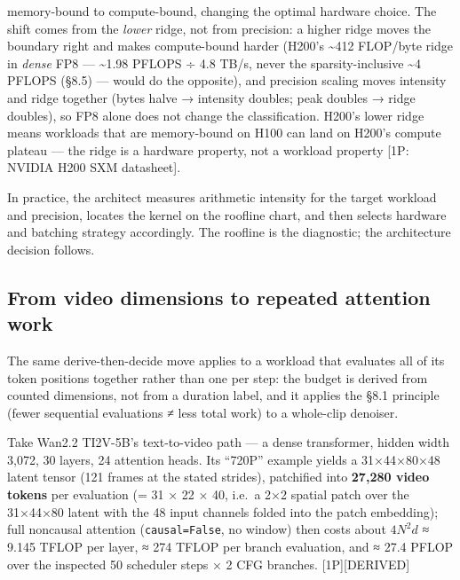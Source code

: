 \begin{itemize}
  memory-bound to compute-bound, changing the optimal hardware choice.
  The shift comes from the \emph{lower} ridge, not from precision: a
  higher ridge moves the boundary right and makes compute-bound harder
  (H200's \textasciitilde412 FLOP/byte ridge in \emph{dense} FP8 ---
  \textasciitilde1.98 PFLOPS ÷ 4.8 TB/s, never the sparsity-inclusive
  \textasciitilde4 PFLOPS (§8.5) --- would do the opposite), and
  precision scaling moves intensity and ridge together (bytes halve →
  intensity doubles; peak doubles → ridge doubles), so FP8 alone does
  not change the classification. H200's lower ridge means workloads that
  are memory-bound on H100 can land on H200's compute plateau --- the
  ridge is a hardware property, not a workload property {[}1P: NVIDIA
  H200 SXM datasheet{]}.
\end{itemize}

In practice, the architect measures arithmetic intensity for the target
workload and precision, locates the kernel on the roofline chart, and
then selects hardware and batching strategy accordingly. The roofline is
the diagnostic; the architecture decision follows.

\subsection{From video dimensions to repeated attention
work}\label{from-video-dimensions-to-repeated-attention-work}

The same derive-then-decide move applies to a workload that evaluates
all of its token positions together rather than one per step: the budget
is derived from counted dimensions, not from a duration label, and it
applies the §8.1 principle (fewer sequential evaluations ≠ less total
work) to a whole-clip denoiser.

Take Wan2.2 TI2V-5B's text-to-video path --- a dense transformer, hidden
width 3,072, 30 layers, 24 attention heads. Its ``720P'' example yields
a 31×44×80×48 latent tensor (121 frames at the stated strides),
patchified into \textbf{27,280 video tokens} per evaluation (= 31 × 22 ×
40, i.e.~a 2×2 spatial patch over the 31×44×80 latent with the 48 input
channels folded into the patch embedding); full noncausal attention
(\texttt{causal=False}, no window) then costs about \(4N^2d\) ≈ 9.145
TFLOP per layer, ≈ 274 TFLOP per branch evaluation, and ≈ 27.4 PFLOP
over the inspected 50 scheduler steps × 2 CFG branches.
\mbox{{[}1P{]}}\hspace{0pt}\mbox{{[}DERIVED{]}}

